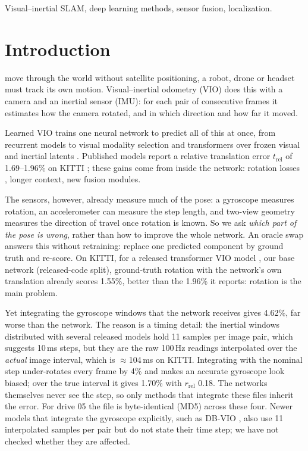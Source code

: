 \documentclass[letterpaper,journal]{IEEEtran}
\begin{document}
\begin{IEEEkeywords}
Visual--inertial SLAM, deep learning methods, sensor fusion, localization.
\end{IEEEkeywords}

\section{Introduction}

 move through the world without satellite positioning, a robot, drone or headset must track its own motion. Visual--inertial odometry (VIO) does this with a camera and an inertial sensor (IMU): for each pair of consecutive frames it estimates how the camera rotated, and in which direction and how far it moved.

Learned VIO trains one neural network to predict all of this at once, from recurrent models \cite{Clark2017,Han2019} to visual modality selection \cite{Yang2022} and transformers over frozen visual and inertial latents \cite{Kurt2024}. Published models report a relative translation error $t_\mathrm{rel}$ of 1.69--1.96\% on KITTI \cite{Kurt2024,Ma2026,Wan2026}; these gains come from inside the network: rotation losses \cite{Chen2022}, longer context, new fusion modules.

The sensors, however, already measure much of the pose: a gyroscope measures rotation, an accelerometer can measure the step length, and two-view geometry measures the direction of travel once rotation is known. So we ask \emph{which part of the pose is wrong}, rather than how to improve the whole network. An oracle swap answers this without retraining: replace one predicted component by ground truth and re-score. On KITTI, for a released transformer VIO model \cite{Kurt2024}, our base network (released-code split), ground-truth rotation with the network's own translation already scores 1.55\%, better than the 1.96\% it reports: rotation is the main problem.

Yet integrating the gyroscope windows that the network receives gives 4.62\%, far worse than the network. The reason is a timing detail: the inertial windows distributed with several released models \cite{Yang2022,Kurt2024,Chen2023NASVIO,Park2024ULVIO} hold 11 samples per image pair, which suggests 10\,ms steps, but they are the raw 100\,Hz readings interpolated over the \emph{actual} image interval, which is $\approx$104\,ms on KITTI. Integrating with the nominal step under-rotates every frame by 4\% and makes an accurate gyroscope look biased; over the true interval it gives 1.70\% with $r_\mathrm{rel}$ 0.18. The networks themselves never see the step, so only methods that integrate these files inherit the error. For drive 05 the file is byte-identical (MD5) across these four. Newer models that integrate the gyroscope explicitly, such as DB-VIO \cite{Wan2026}, also use 11 interpolated samples per pair but do not state their time step; we have not checked whether they are affected.
\end{document}
